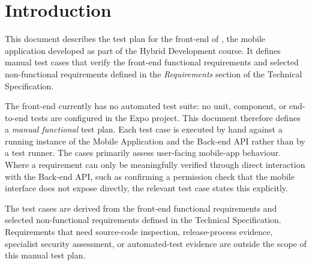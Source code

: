 \section{Introduction}\label{sec:hd-testplan-introduction}
This document describes the test plan for the front-end of \tradesq{}, the mobile application developed as part of the Hybrid Development course.
It defines manual test cases that verify the front-end functional requirements and selected non-functional requirements defined in the \emph{Requirements} section of the Technical Specification. 

The front-end currently has no automated test suite: no unit, component, or end-to-end tests are configured in the Expo project.
This document therefore defines a \emph{manual functional} test plan.
Each test case is executed by hand against a running instance of the \tradesq{} Mobile Application and the \tradesq{} Back-end API rather than by a test runner.
The cases primarily assess user-facing mobile-app behaviour.
Where a requirement can only be meaningfully verified through direct interaction with the \tradesq{} Back-end API, such as confirming a permission check that the mobile interface does not expose directly, the relevant test case states this explicitly.

The test cases are derived from the front-end functional requirements and selected non-functional requirements defined in the Technical Specification.
Requirements that need source-code inspection, release-process evidence, specialist security assessment, or automated-test evidence are outside the scope of this manual test plan.
